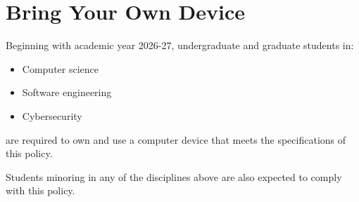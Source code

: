 \section{Bring Your Own Device}

Beginning with academic year 2026-27, undergraduate and graduate students in:

\begin{itemize}
    \item Computer science
    \item Software engineering
    \item Cybersecurity
\end{itemize}
%
are required to own and use a computer device that meets the specifications of this policy.

Students minoring in any of the disciplines above are also expected to comply with this policy.